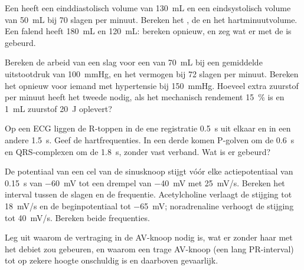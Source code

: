 \begin{exercise}[$\star\star$]\label{exo:b2:heart:5}
Een  heeft een einddiastolisch volume van \qty{130}{mL} en een
eindsystolisch volume van \qty{50}{mL} bij 70 slagen per minuut. Bereken het
, de  en het hartminuutvolume. Een falend  heeft
\qty{180}{mL} en \qty{120}{mL}: bereken opnieuw, en zeg wat er met de
 is gebeurd.
\end{exercise}

\begin{exercise}[$\star\star$]\label{exo:b2:heart:6}
Bereken de arbeid van een slag voor een  van \qty{70}{mL} bij een
gemiddelde uitstootdruk van \qty{100}{mmHg}, en het vermogen bij 72 slagen
per minuut. Bereken het opnieuw voor iemand met hypertensie bij
\qty{150}{mmHg}. Hoeveel extra zuurstof per minuut heeft het tweede 
nodig, als het mechanisch rendement \qty{15}{\%} is en \qty{1}{mL} zuurstof
\qty{20}{J} oplevert?
\end{exercise}

\begin{exercise}[$\star\star$]\label{exo:b2:heart:7}
Op een ECG liggen de R-toppen in de ene registratie \qty{0.5}{s} uit elkaar
en in een andere \qty{1.5}{s}. Geef de hartfrequenties. In een derde komen
P-golven om de \qty{0.6}{s} en QRS-complexen om de \qty{1.8}{s}, zonder vast
verband. Wat is er gebeurd?
\end{exercise}

\begin{exercise}[$\star\star$]\label{exo:b2:heart:8}
De potentiaal van een cel van de sinusknoop stijgt vóór elke actiepotentiaal
van \qty{0.15}{s} van \qty{-60}{mV} tot een drempel van \qty{-40}{mV} met
\qty{25}{mV/s}. Bereken het interval tussen de slagen en de frequentie.
Acetylcholine verlaagt de stijging tot \qty{18}{mV/s} en de beginpotentiaal
tot \qty{-65}{mV}; noradrenaline verhoogt de stijging tot
\qty{40}{mV/s}. Bereken beide frequenties.
\end{exercise}

\begin{exercise}[$\star\star$]\label{exo:b2:heart:9}
Leg uit waarom de vertraging in de AV-knoop nodig is, wat er zonder haar met
het debiet zou gebeuren, en waarom een trage AV-knoop (een lang PR-interval)
tot op zekere hoogte onschuldig is en daarboven gevaarlijk.
\end{exercise}

